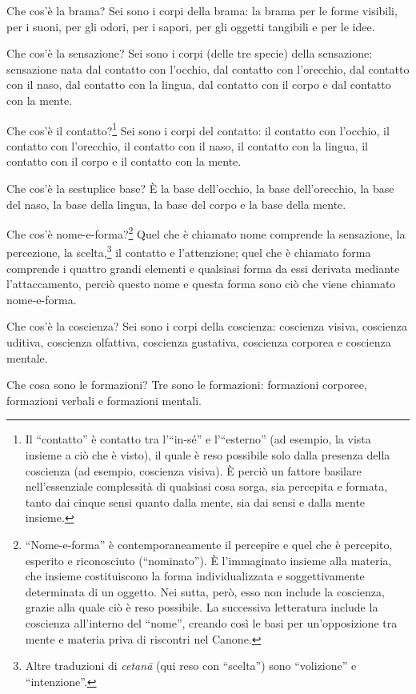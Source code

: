 Che cos’è la brama?
Sei sono i corpi della brama: la brama per le forme visibili, per i
suoni, per gli odori, per i sapori, per gli oggetti tangibili e per le
idee.


Che cos’è la sensazione? Sei sono i corpi (delle tre specie) della
sensazione: sensazione nata dal contatto con l’occhio, dal contatto con
l’orecchio, dal contatto con il naso, dal contatto con la lingua, dal
contatto con il corpo e dal contatto con la mente.


Che cos’è il
contatto?\footnote{Il “contatto” è contatto tra l’“in-sé” e l’“esterno” (ad esempio, la vista insieme a ciò che è visto), il quale è reso possibile solo dalla presenza della coscienza (ad esempio, coscienza visiva). È perciò un fattore basilare nell’essenziale complessità di qualsiasi cosa sorga, sia percepita e formata, tanto dai cinque sensi quanto dalla mente, sia dai sensi e dalla mente insieme.} Sei sono i corpi del contatto: il contatto
con l’occhio, il contatto con l’orecchio, il contatto con il naso, il
contatto con la lingua, il contatto con il corpo e il contatto con la
mente.


Che cos’è la sestuplice base? È la base dell’occhio, la base
dell’orecchio, la base del naso, la base della lingua, la base del corpo
e la base della mente.


Che cos’è nome-e-forma?\footnote{“Nome-e-forma” è contemporaneamente il percepire e quel che è percepito, esperito e riconosciuto (“nominato”). È l’immaginato insieme alla materia, che insieme costituiscono la forma individualizzata e soggettivamente determinata di un oggetto. Nei sutta, però, esso non include la coscienza, grazie alla quale ciò è reso possibile. La successiva letteratura include la coscienza all’interno del “nome”, creando così le basi per un’opposizione tra mente e materia priva di riscontri nel Canone.} Quel che
è chiamato nome comprende la sensazione, la percezione, la
scelta,\footnote{Altre traduzioni di \emph{cetanā} (qui reso con “scelta”) sono “volizione” e “intenzione”.} il contatto e l’attenzione; quel che è
chiamato forma comprende i quattro grandi elementi e qualsiasi forma da
essi derivata mediante l’attaccamento, perciò questo nome e questa forma
sono ciò che viene chiamato nome-e-forma.


Che cos’è la coscienza? Sei
sono i corpi della coscienza: coscienza visiva, coscienza uditiva,
coscienza olfattiva, coscienza gustativa, coscienza corporea e coscienza
mentale.


Che cosa sono le formazioni? Tre sono le formazioni: formazioni
corporee, formazioni verbali e formazioni mentali.


